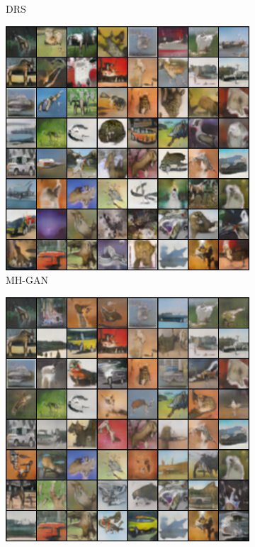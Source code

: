 \begin{figure}[htbp]
\begin{subfigure}[b]{0.49\textwidth}
       \caption{DRS}
    \end{subfigure}
    \begin{subfigure}[b]{0.49\textwidth}
       \centering
       \includegraphics[width=1.0\textwidth]{figures/cifar/192_base_raw_MH.png}
       \caption{MH-GAN}
    \end{subfigure}
    \begin{subfigure}[b]{0.49\textwidth}
       \centering
       \includegraphics[width=1.0\textwidth]{figures/cifar/192_base_iso_MH.png}

\end{subfigure}
\end{figure}
